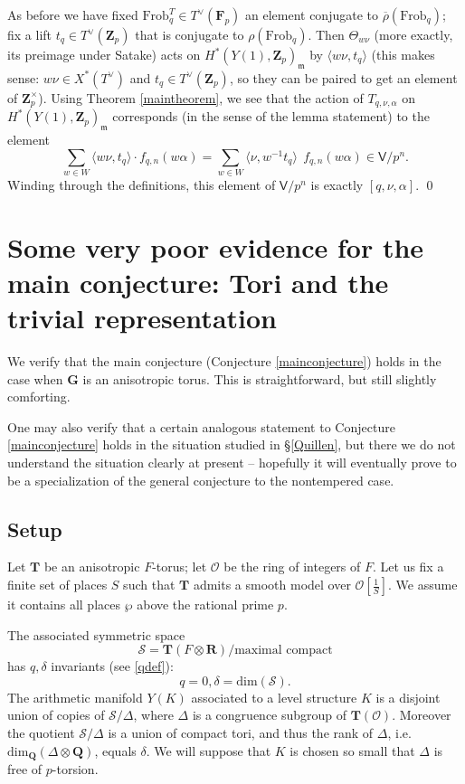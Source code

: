 \documentclass[10pt]{amsart}
\newcommand{\Z}{\mathbf{Z}}
\newcommand{\rhobar}{\overline{\rho}}
\newcommand{\Frob}{\mathrm{Frob}}
\newcommand{\Vinf}{\mathsf{V}}
\renewcommand{\dim}{\mathrm{dim}}
\newcommand{\Q}{\mathbf{Q}}
\newcommand{\R}{\mathbf{R}}
\newcommand{\ramprimes}{S}
\theoremstyle{remark}
\newcommand{\F}{\mathbf{F}}
\begin{document}
As before we have fixed $\Frob^T_q \in T^{\vee}(\F_p)$ an element conjugate to $\rhobar(\Frob_q)$;
fix a lift $t_q \in T^{\vee}(\Z_p)$ that is conjugate to $\rho(\Frob_q)$. 
Then  $ \Theta_{w \nu}$  (more exactly, its preimage under Satake) acts on $H^*(Y(1), \Z_p)_{\mathfrak{m}}$
by  $\langle w \nu, t_q \rangle$ (this makes sense: $w \nu \in X^*(T^{\vee})$ and $t_q \in T^{\vee}(\Z_p)$, so they can be paired to get an element of $\Z_p^{\times}$).   Using Theorem \ref{maintheorem}, we see that the action of $T_{q,\nu, \alpha}$ on $H^*(Y(1), \Z_p)_{\mathfrak{m}}$
corresponds (in the sense  of the lemma statement) to the element
$$ \sum_{w \in W} \langle w \nu, t_q \rangle \cdot f_{q,n}(w \alpha)  =  \sum_{w \in W} \langle \nu, w^{-1} t_q \rangle \ \  f_{q,n}(w \alpha) \in  \Vinf/p^n.$$
Winding through the definitions, this element of $\Vinf/p^n$ is  exactly $[q, \nu, \alpha]$. \qed 

 
 
 \section{Some very poor evidence for the main conjecture: Tori and the trivial representation} \label{pisspoor}
 
 We verify that the main conjecture  (Conjecture \ref{mainconjecture})
  holds in the case when $\mathbf{G}$ is an anisotropic torus.  This is straightforward,  but still slightly comforting. 
  
  One may also verify that  a certain analogous statement to Conjecture \ref{mainconjecture}
  holds in the situation studied in  \S \ref{Quillen},
but there we do not understand the situation clearly at present --  hopefully it will eventually prove to be a specialization
 of the general conjecture to the nontempered case.
    
  \subsection{Setup} \label{tori}

Let $\mathbf{T}$ be an anisotropic $F$-torus; let $\mathcal{O}$ be the ring of integers of $F$. 
Let us fix a finite set of places $\ramprimes$ such that $\mathbf{T}$ admits a smooth model over $\mathcal{O}[\frac{1}{\ramprimes}]$. 
We assume it contains all places $\wp$ above the rational prime $p$. 



  The associated symmetric space 
$$ \mathcal{S} =  \mathbf{T}(F \otimes \R)/\mbox{maximal compact}$$
has  $q,\delta$ invariants (see \eqref{qdef}):
$$ q= 0 , \delta = \dim(\mathcal{S}).$$ 
%
%
The arithmetic manifold $Y(K)$ associated to a level structure $K$  is
a disjoint union of copies of $\mathcal{S}/\Delta$, where 
  $\Delta$ is a congruence subgroup of $\mathbf{T}(\mathcal{O})$. 
Moreover  the quotient $ \mathcal{S}/\Delta$ is a union of compact tori, and thus 
the rank of $\Delta$, i.e. $\dim_{\Q} (\Delta \otimes \Q)$, equals $\delta$.  
  We will suppose that $K$ is chosen so small that $\Delta$ is free of $p$-torsion.
 
\end{document}
